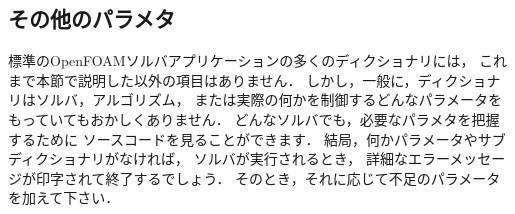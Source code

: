 \subsection{その他のパラメタ}
\label{ssec:4.5.4}
標準のOpenFOAMソルバアプリケーションの多くのディクショナリには，
これまで本節で説明した以外の項目はありません．
しかし，一般に，ディクショナリはソルバ，アルゴリズム，
または実際の何かを制御するどんなパラメータをもっていてもおかしくありません．
どんなソルバでも，必要なパラメタを把握するために
ソースコードを見ることができます．
結局，何かパラメータやサブディクショナリがなければ，
ソルバが実行されるとき，
詳細なエラーメッセージが印字されて終了するでしょう．
そのとき，それに応じて不足のパラメータを加えて下さい．

